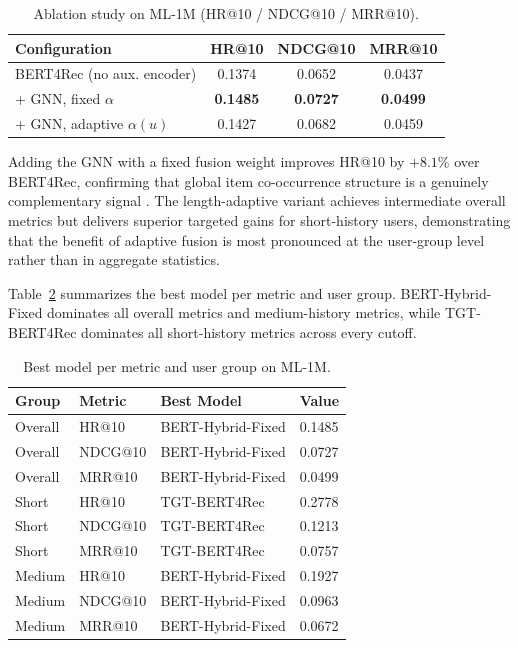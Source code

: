 \documentclass[12pt,a4paper]{report}
\newcommand{\parencite}[1]{\citep{#1}}
\begin{document}
\begin{table}[h]
\centering
\caption{Ablation study on ML-1M (HR@10 / NDCG@10 / MRR@10).}
\label{tab:ablation}
\renewcommand{\arraystretch}{1.3}
\small
\begin{tabular}{lccc}
\toprule
\textbf{Configuration} & \textbf{HR@10} & \textbf{NDCG@10} & \textbf{MRR@10} \\
\midrule
BERT4Rec (no aux. encoder)    & 0.1374 & 0.0652 & 0.0437 \\
+ GNN, fixed \(\alpha\)       & \textbf{0.1485} & \textbf{0.0727} & \textbf{0.0499} \\
+ GNN, adaptive \(\alpha(u)\) & 0.1427 & 0.0682 & 0.0459 \\
\bottomrule
\end{tabular}
\end{table}

Adding the GNN with a fixed fusion weight improves HR@10 by \(+8.1\%\) over BERT4Rec, confirming that global item co-occurrence structure is a genuinely complementary signal \parencite{ouledmeriem2025hybrid}. The length-adaptive variant achieves intermediate overall metrics but delivers superior targeted gains for short-history users, demonstrating that the benefit of adaptive fusion is most pronounced at the user-group level rather than in aggregate statistics.

Table~\ref{tab:best_per_metric} summarizes the best model per metric and user group. BERT-Hybrid-Fixed dominates all overall metrics and medium-history metrics, while TGT-BERT4Rec dominates all short-history metrics across every cutoff.

\begin{table}[h]
\centering
\caption{Best model per metric and user group on ML-1M.}
\label{tab:best_per_metric}
\renewcommand{\arraystretch}{1.3}
\small
\begin{tabular}{llll}
\toprule
\textbf{Group} & \textbf{Metric} & \textbf{Best Model} & \textbf{Value} \\
\midrule
Overall & HR@10   & BERT-Hybrid-Fixed & 0.1485 \\
Overall & NDCG@10 & BERT-Hybrid-Fixed & 0.0727 \\
Overall & MRR@10  & BERT-Hybrid-Fixed & 0.0499 \\
\midrule
Short   & HR@10   & TGT-BERT4Rec      & 0.2778 \\
Short   & NDCG@10 & TGT-BERT4Rec      & 0.1213 \\
Short   & MRR@10  & TGT-BERT4Rec      & 0.0757 \\
\midrule
Medium  & HR@10   & BERT-Hybrid-Fixed & 0.1927 \\
Medium  & NDCG@10 & BERT-Hybrid-Fixed & 0.0963 \\
Medium  & MRR@10  & BERT-Hybrid-Fixed & 0.0672 \\
\bottomrule
\end{tabular}
\end{table}
\end{document}
